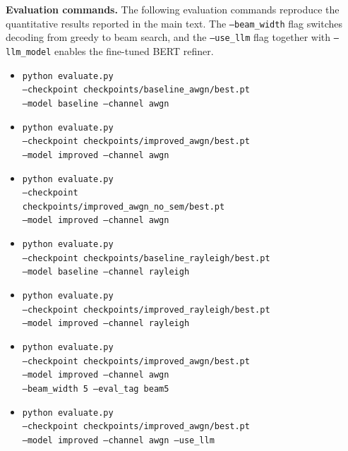 \textbf{Evaluation commands.} The following evaluation commands reproduce the quantitative results reported in the main text. The \texttt{--beam\_width} flag switches decoding from greedy to beam search, and the \texttt{--use\_llm} flag together with \texttt{--llm\_model} enables the fine-tuned BERT refiner.
\begin{itemize}
    \item \texttt{python evaluate.py}\\
    \texttt{\phantom{xx}--checkpoint checkpoints/baseline\_awgn/best.pt}\\
    \texttt{\phantom{xx}--model baseline --channel awgn}
    \item \texttt{python evaluate.py}\\
    \texttt{\phantom{xx}--checkpoint checkpoints/improved\_awgn/best.pt}\\
    \texttt{\phantom{xx}--model improved --channel awgn}
    \item \texttt{python evaluate.py}\\
    \texttt{\phantom{xx}--checkpoint}\\
    \texttt{\phantom{xx}checkpoints/improved\_awgn\_no\_sem/best.pt}\\
    \texttt{\phantom{xx}--model improved --channel awgn}
    \item \texttt{python evaluate.py}\\
    \texttt{\phantom{xx}--checkpoint checkpoints/baseline\_rayleigh/best.pt}\\
    \texttt{\phantom{xx}--model baseline --channel rayleigh}
    \item \texttt{python evaluate.py}\\
    \texttt{\phantom{xx}--checkpoint checkpoints/improved\_rayleigh/best.pt}\\
    \texttt{\phantom{xx}--model improved --channel rayleigh}
    \item \texttt{python evaluate.py}\\
    \texttt{\phantom{xx}--checkpoint checkpoints/improved\_awgn/best.pt}\\
    \texttt{\phantom{xx}--model improved --channel awgn}\\
    \texttt{\phantom{xx}--beam\_width 5 --eval\_tag beam5}
    \item \texttt{python evaluate.py}\\
    \texttt{\phantom{xx}--checkpoint checkpoints/improved\_awgn/best.pt}\\
    \texttt{\phantom{xx}--model improved --channel awgn --use\_llm}\\

\end{itemize}
